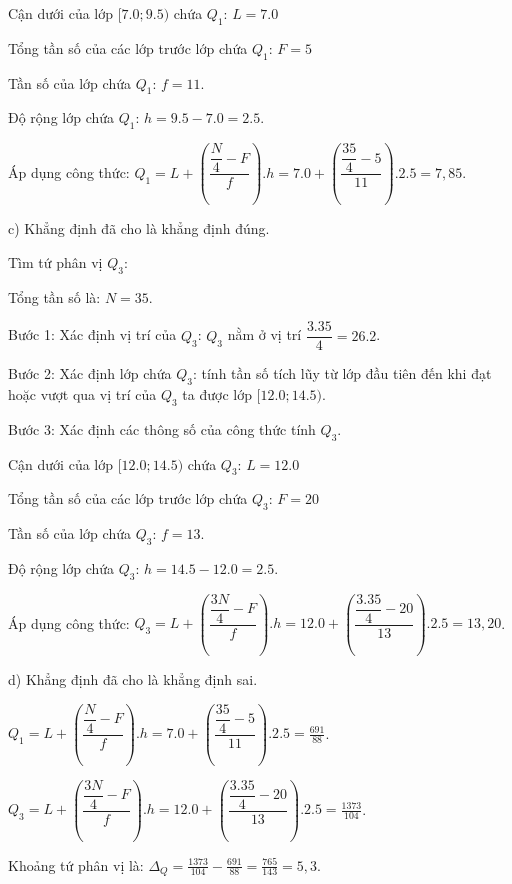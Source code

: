 \documentclass[12pt,a4paper]{article}
\begin{document}
\begin{ex}
{ Cận dưới của lớp $[7.0;9.5)$ chứa $Q_1$: $L=7.0$

 Tổng tần số của các lớp trước lớp chứa $Q_1$: $F=5$

 Tần số của lớp chứa $Q_1$: $f=11$.

 Độ rộng lớp chứa $Q_1$: $h=9.5 - 7.0=2.5$.

Áp dụng công thức: $Q_1=L+\left(\dfrac{ \dfrac{N}{4}-F }{f}\right).h=7.0+\left(\dfrac{ \dfrac{35}{4}-5 }{11}\right).2.5=7,85$.



c) Khẳng định đã cho là khẳng định đúng.

 Tìm tứ phân vị $Q_3$:

Tổng tần số là: $N=35$.

Bước 1: Xác định vị trí của $Q_3$: $Q_3$ nằm ở vị trí $\dfrac{3.35}{4}=26.2$.

Bước 2: Xác định lớp chứa $Q_3$: tính tần số tích lũy từ lớp đầu tiên đến khi đạt hoặc vượt qua vị trí của $Q_3$ ta được lớp $[12.0;14.5)$.

Bước 3: Xác định các thông số của công thức tính $Q_3$.

 Cận dưới của lớp $[12.0;14.5)$ chứa $Q_3$: $L=12.0$

 Tổng tần số của các lớp trước lớp chứa $Q_3$: $F=20$

 Tần số của lớp chứa $Q_3$: $f=13$.

 Độ rộng lớp chứa $Q_3$: $h=14.5 - 12.0=2.5$.

Áp dụng công thức: $Q_3=L+\left(\dfrac{ \dfrac{3N}{4}-F }{f}\right).h=12.0+\left(\dfrac{ \dfrac{3.35}{4}-20 }{13}\right).2.5=13,20$.



d) Khẳng định đã cho là khẳng định sai.

  $Q_1=L+\left(\dfrac{ \dfrac{N}{4}-F }{f}\right).h=7.0+\left(\dfrac{ \dfrac{35}{4}-5 }{11}\right).2.5=\frac{691}{88}$.

$Q_3=L+\left(\dfrac{ \dfrac{3N}{4}-F }{f}\right).h=12.0+\left(\dfrac{ \dfrac{3.35}{4}-20 }{13}\right).2.5=\frac{1373}{104}$.

Khoảng tứ phân vị là: $\Delta_Q=\frac{1373}{104}-\frac{691}{88}=\frac{765}{143}=5,3$.



 
 }\end{ex}
\end{document}

